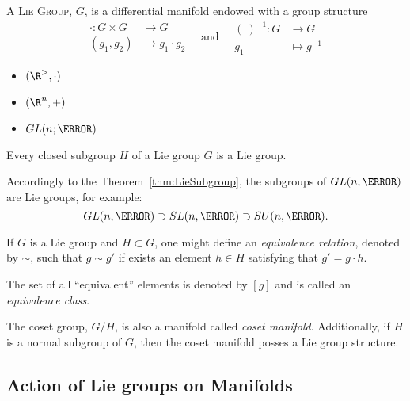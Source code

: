 \begin{Def}
  A \textsc{Lie Group}, $G$, is a differential manifold endowed with a group structure
  \begin{equation}
    \begin{split}
      \cdot: G \times G &\to G \\
      (g_1,g_2) &\mapsto g_1 \cdot g_2
    \end{split}
    \quad
    \text{and}
    \quad
    \begin{split}
      (\ )^{-1}: G &\to G \\
      g_1 &\mapsto g^{-1}
    \end{split}
  \end{equation}
\end{Def}

\begin{Exa}
  \mbox{}
  \begin{itemize}
  \item $(\R^>,\cdot)$
  \item $(\R^n,+)$
  \item $GL(n;\K)$
  \end{itemize}
\end{Exa}

\begin{Thm}\label{thm:LieSubgroup}
  Every closed subgroup $H$ of a Lie group $G$ is a Lie group.
\end{Thm}

Accordingly to the Theorem~\ref{thm:LieSubgroup}, the subgroups of $GL(n,\K)$ are Lie groups, for example:
\begin{equation*}
  GL(n,\K) \supset SL(n,\K) \supset SU(n,\K).
\end{equation*}

If $G$ is a Lie group and $H \subset G$, one might define an \emph{equivalence relation}, denoted by $\sim$, such that $g \sim g'$ if exists an element $h \in H$ satisfying that $g' = g \cdot h$.

The set of all ``equivalent'' elements is denoted by $[g]$ and is called an \emph{equivalence class}.

The coset group, $G/H$, is also a manifold called \emph{coset manifold}. Additionally, if $H$ is a normal subgroup of $G$, then the coset manifold posses a Lie group structure.


\subsection{Action of Lie groups on Manifolds}

